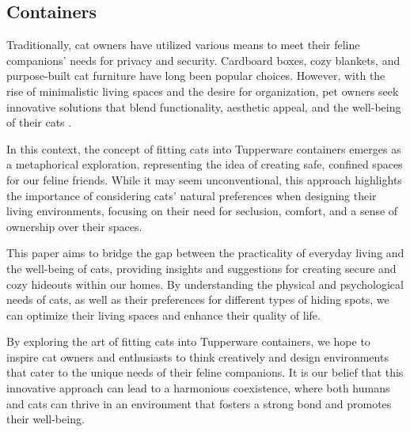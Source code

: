 \subsection{Containers}

Traditionally, cat owners have utilized various means to meet their feline companions' needs for privacy and security. Cardboard boxes, cozy blankets, and purpose-built cat furniture have long been popular choices. However, with the rise of minimalistic living spaces and the desire for organization, pet owners seek innovative solutions that blend functionality, aesthetic appeal, and the well-being of their cats \cite{tupperware:catcontainer}.

In this context, the concept of fitting cats into Tupperware containers emerges as a metaphorical exploration, representing the idea of creating safe, confined spaces for our feline friends. While it may seem unconventional, this approach highlights the importance of considering cats' natural preferences when designing their living environments, focusing on their need for seclusion, comfort, and a sense of ownership over their spaces.

This paper aims to bridge the gap between the practicality of everyday living and the well-being of cats, providing insights and suggestions for creating secure and cozy hideouts within our homes. By understanding the physical and psychological needs of cats, as well as their preferences for different types of hiding spots, we can optimize their living spaces and enhance their quality of life.

By exploring the art of fitting cats into Tupperware containers, we hope to inspire cat owners and enthusiasts to think creatively and design environments that cater to the unique needs of their feline companions. It is our belief that this innovative approach can lead to a harmonious coexistence, where both humans and cats can thrive in an environment that fosters a strong bond and promotes their well-being.
